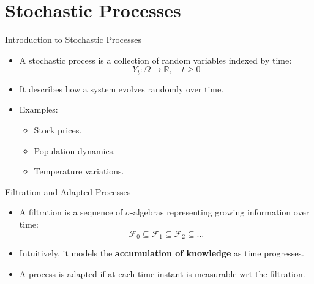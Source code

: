 \section{Stochastic Processes}

\begin{frame}{Introduction to Stochastic Processes}
  \begin{itemize}
    \item A stochastic process is a collection of random variables indexed by time:
    \begin{equation}
      Y_t: \Omega \to \mathbb{R}, \quad t \geq 0
    \end{equation}
    \item It describes how a system evolves randomly over time.
    \item Examples:
    \begin{itemize}
      \item Stock prices.
      \item Population dynamics.
      \item Temperature variations.
    \end{itemize}
  \end{itemize}
\end{frame}



\begin{frame}{Filtration and Adapted Processes}
  \begin{itemize}
    \item A filtration is a sequence of $\sigma$-algebras representing growing information over time:
    \begin{equation}
      \mathcal{F}_0 \subseteq \mathcal{F}_1 \subseteq \mathcal{F}_2 \subseteq \dots
    \end{equation}
    \item Intuitively, it models the \textbf{accumulation of knowledge} as time progresses.
    \item A process is adapted if at each time instant is measurable wrt the filtration.
  \end{itemize}


  
\end{frame}

